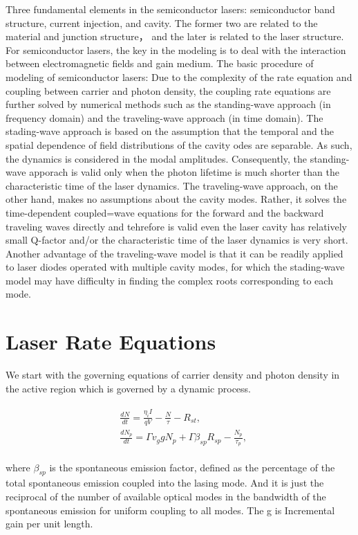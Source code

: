 Three fundamental elements in the semiconductor lasers: semiconductor band
structure, current injection, and cavity. The former two are related to the
material and junction structure， and the later is related to the laser
structure. For semiconductor lasers, the key in the modeling is to deal with
the interaction between electromagnetic fields and gain medium. The basic
procedure of modeling of semiconductor lasers: Due to the complexity of the
rate equation and coupling between carrier and photon density, the coupling
rate equations are further solved by numerical methods such as the
standing-wave approach (in frequency domain) and the traveling-wave approach
(in time domain). The stading-wave approach is based on the assumption that the
temporal and the spatial dependence of field distributions of the cavity odes
are separable. As such, the dynamics is considered in the modal amplitudes.
Consequently, the standing-wave apporach is valid only when the photon lifetime
is much shorter than the characteristic time of the laser dynamics. The
traveling-wave approach, on the other hand, makes no assumptions about the
cavity modes. Rather, it solves the time-dependent coupled=wave equations for
the forward and the backward traveling waves directly and tehrefore is valid
even the laser cavity has relatively small Q-factor and/or the characteristic
time of the laser dynamics is very short. Another advantage of the
traveling-wave model is that it can be readily applied to laser diodes operated
with multiple cavity modes, for which the stading-wave model may have
difficulty in finding the complex roots corresponding to each mode.
\section{Laser Rate Equations} \label{corrections} 


We start with the governing equations of carrier density and photon density in
the active region which is governed by a dynamic process.

\begin{eqnarray}
\begin{aligned}
  & \frac{dN}{dt} = \frac{\eta_{i}I}{qV} - \frac{N}{\tau} - R_{st},
  \\
  & \frac{dN_p}{dt} = {\Gamma}v_g{g}N_p + \Gamma\beta_{sp}R_{sp} - \frac{N_p}{\tau_p},
\end{aligned}
\label{eq:eight}
\end{eqnarray}

where $\beta_{sp}$ is the spontaneous emission factor, defined as the
percentage of the total spontaneous emission coupled into the lasing mode. And it is
just the reciprocal of the number of available optical modes in the bandwidth of
the spontaneous emission for uniform coupling to all modes. The g is Incremental gain
per unit length.

